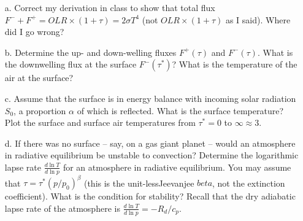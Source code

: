 \documentclass{article}
\begin{document}
\begin{enumerate}

\item[a.] Correct my derivation in class to show that total flux $F^- + F^+ = OLR \times (1 + \tau) = 2 \sigma T^4$ (not $OLR \times (1 + \tau)$ as I said). Where did I go wrong? 

\item[b.] Determine the up- and down-welling fluxes $F^+(\tau)$ and  $F^-(\tau)$. What is the downwelling flux at the surface $F^-(\tau^*)$? What is the temperature of the air at the surface? 

\item[c.] Assume that the surface is in energy balance with incoming solar radiation $S_0$, a proportion $\alpha$ of which is reflected. What is the surface temperature? Plot the surface and surface air temperatures from $\tau^* = 0$ to $\infty \approx 3$. 

\item[d.] If there was no surface -- say, on a gas giant planet -- would an atmosphere in radiative equilibrium be unstable to convection? Determine the logarithmic lapse rate $\frac{d\ln T}{d\ln p}$ for an atmosphere in radiative equilibrium. You may assume that $\tau = \tau^*(p/p_0)^{\beta}$ (this is the unit-lessJeevanjee $beta$, not the extinction coefficient). What is the condition for stability? Recall that the dry adiabatic lapse rate of the atmosphere 
is $\frac{d\ln T}{d\ln p} = -R_d/c_p$. 
\end{enumerate}
\end{document}
